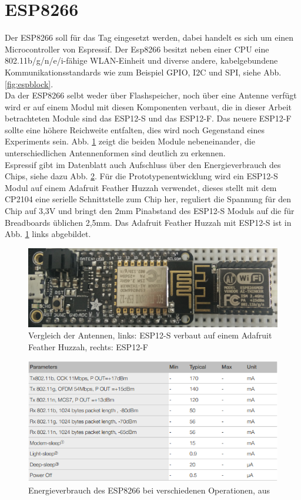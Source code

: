 \section{ESP8266}
Der ESP8266 soll für das Tag eingesetzt werden, dabei handelt es sich um einen Microcontroller von Espressif.
Der Esp8266 besitzt neben einer CPU eine 802.11b/g/n/e/i-fähige WLAN-Einheit und diverse andere, kabelgebundene Kommunikationsstandards wie zum Beispiel GPIO, I2C und SPI, siehe Abb. \ref{fig:espblock}. \\
Da der ESP8266 selbt weder über Flashspeicher, noch über eine Antenne verfügt wird er auf einem Modul mit diesen Komponenten verbaut, die in dieser Arbeit betrachteten Module sind das ESP12-S und das ESP12-F.
Das neuere ESP12-F sollte eine höhere Reichweite entfalten, dies wird noch Gegenstand eines Experiments sein.
Abb. \ref{fig:espmodules} zeigt die beiden Module nebeneinander, die unterschiedlichen Antennenformen sind deutlich zu erkennen.\\
Espressif gibt im Datenblatt auch Aufschluss über den Energieverbrauch des Chips, siehe dazu Abb. \ref{fig:esppower}.
Für die Prototypenentwicklung wird ein ESP12-S Modul auf einem Adafruit Feather Huzzah verwendet, dieses stellt mit dem CP2104 eine serielle Schnittstelle zum Chip her, reguliert die Spannung für den Chip auf 3,3V und bringt den 2mm Pinabstand des ESP12-S Moduls auf die für Breadboards üblichen 2,5mm.
Das Adafruit Feather Huzzah mit ESP12-S ist in Abb. \ref{fig:espmodules} links abgebildet.

\begin{figure}[h]
  \centering
	\includegraphics[width=\textwidth]{images/espmodules.png}
  \caption{Vergleich der Antennen, links: ESP12-S verbaut auf einem Adafruit Feather Huzzah, rechts: ESP12-F}
  \label{fig:espmodules}
\end{figure}

\begin{figure}[h]
  \centering
	\includegraphics[width=\textwidth]{images/esppower.png}
  \caption{Energieverbrauch des ESP8266 bei verschiedenen Operationen, aus \cite{espressif2017esp8266}}
  \label{fig:esppower}
\end{figure}


